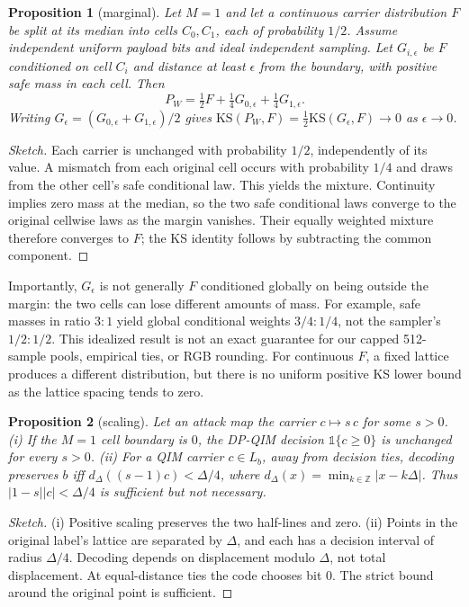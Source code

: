 \documentclass[conference,10pt]{IEEEtran}
\newtheorem{proposition}{Proposition}
\begin{document}
\begin{proposition}[marginal]
\label{prop:ks}
Let $M=1$ and let a continuous carrier distribution $F$ be split at its median
into cells $C_0,C_1$, each of probability $1/2$. Assume independent uniform
payload bits and ideal independent sampling. Let $G_{i,\epsilon}$ be $F$
conditioned on cell $C_i$ and distance at least $\epsilon$ from the boundary,
with positive safe mass in each cell. Then
\[
 P_W=\tfrac12F+\tfrac14G_{0,\epsilon}+\tfrac14G_{1,\epsilon}.
\]
Writing $G_\epsilon=(G_{0,\epsilon}+G_{1,\epsilon})/2$ gives
$\mathrm{KS}(P_W,F)=\tfrac12\mathrm{KS}(G_\epsilon,F)\to0$ as
$\epsilon\to0$.
\end{proposition}
\begin{proof}[Sketch]
Each carrier is unchanged with probability $1/2$, independently of its value.
A mismatch from each original cell occurs with probability $1/4$ and draws
from the other cell's safe conditional law. This yields the mixture.
Continuity implies zero mass at the median, so the two safe conditional laws
converge to the original cellwise laws as the margin vanishes. Their equally
weighted mixture therefore converges to $F$; the KS identity follows by
subtracting the common component.
\end{proof}

Importantly, $G_\epsilon$ is not generally $F$ conditioned globally on being
outside the margin: the two cells can lose different amounts of mass.
For example, safe masses in ratio $3:1$ yield global conditional weights
$3/4:1/4$, not the sampler's $1/2:1/2$. This idealized result is not an exact
guarantee for our capped 512-sample pools, empirical ties, or RGB rounding.
For continuous $F$, a fixed lattice produces a different distribution, but
there is no uniform positive KS lower bound as the lattice spacing tends to zero.

\begin{proposition}[scaling]
\label{prop:scale}
Let an attack map the carrier $c \mapsto s\,c$ for some $s>0$.
(i) If the $M{=}1$ cell boundary is $0$, the DP-QIM decision $\mathbb{1}\{c\geq0\}$
is unchanged for every $s>0$.
(ii) For a QIM carrier $c\in L_b$, away from decision ties, decoding preserves
$b$ iff $d_\Delta((s-1)c)<\Delta/4$, where
$d_\Delta(x)=\min_{k\in\mathbb Z}|x-k\Delta|$.
Thus $|1-s||c|<\Delta/4$ is sufficient but not necessary.
\end{proposition}
\begin{proof}[Sketch]
(i) Positive scaling preserves the two half-lines and zero. (ii) Points in
the original label's lattice are separated by $\Delta$, and each has a
decision interval of radius $\Delta/4$. Decoding depends on displacement
modulo $\Delta$, not total displacement. At equal-distance ties the code
chooses bit 0. The strict bound around the original point is sufficient.
\end{proof}
\end{document}
